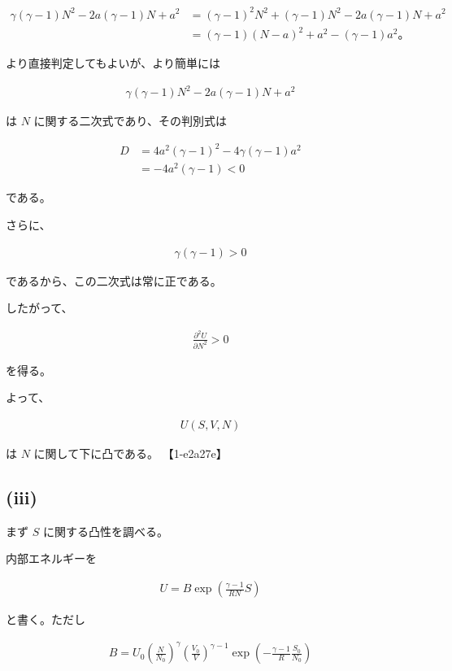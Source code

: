 \documentclass[platex,dvipdfmx,a4paper]{jsarticle}
\begin{document}
\begin{align*}
\gamma(\gamma-1)N^2
-2a(\gamma-1)N
+a^2
&=
(\gamma-1)^2N^2
+
(\gamma-1)N^2
-2a(\gamma-1)N
+a^2 \\
&=
(\gamma-1)(N-a)^2
+a^2-(\gamma-1)a^2。
\end{align*}

より直接判定してもよいが、より簡単には

\begin{align*}
\gamma(\gamma-1)N^2
-2a(\gamma-1)N
+a^2
\end{align*}

は $N$ に関する二次式であり、その判別式は

\begin{align*}
D
&=
4a^2(\gamma-1)^2
-
4\gamma(\gamma-1)a^2 \\
&=
-4a^2(\gamma-1)
<
0
\end{align*}

である。

さらに、

\begin{align*}
\gamma(\gamma-1)>0
\end{align*}

であるから、この二次式は常に正である。

したがって、

\begin{align*}
\frac{\partial^2U}{\partial N^2}
>
0
\end{align*}

を得る。

よって、

\begin{align*}
U(S,V,N)
\end{align*}

は $N$ に関して下に凸である。 【1-e2a27e】

\subsection{(iii)}

まず $S$ に関する凸性を調べる。

内部エネルギーを

\begin{align*}
U
=
B
\exp\left(
\frac{\gamma-1}{RN}S
\right)
\end{align*}

と書く。ただし

\begin{align*}
B
=
U_0
\left(
\frac{N}{N_0}
\right)^\gamma
\left(
\frac{V_0}{V}
\right)^{\gamma-1}
\exp\left(
-\frac{\gamma-1}{R}
\frac{S_0}{N_0}
\right)
\end{align*}
\end{document}
